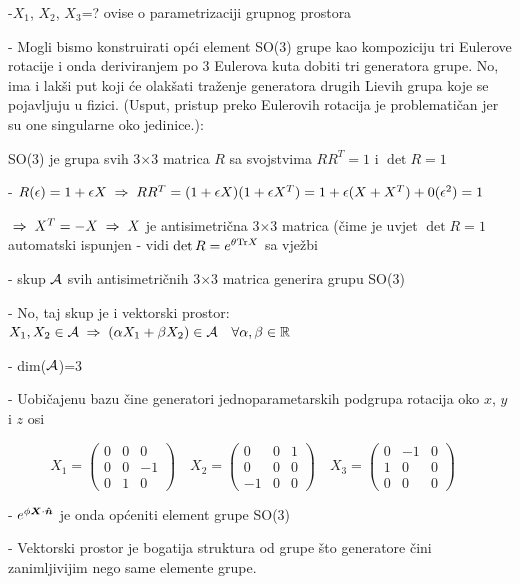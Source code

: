 -$X_1$, $X_2$, $X_3$=? \quad\textrm{ovise o parametrizaciji grupnog prostora}

- Mogli bismo konstruirati opći element SO(3) grupe kao kompoziciju tri
 Eulerove rotacije i onda deriviranjem po 3 Eulerova kuta dobiti tri
 generatora grupe. No, ima i lakši put koji će olakšati traženje 
 generatora drugih Lievih grupa koje se pojavljuju u fizici. 
 (Usput, pristup preko Eulerovih
 rotacija je problematičan jer su one singularne oko jedinice.):

SO(3) je grupa svih 3$\times$3 matrica $R$ sa svojstvima  
  $RR^{T}=1$ i $\det R=1$

- $R(\epsilon)=1+\epsilon X \;\Rightarrow\; RR^{T}=(1+\epsilon X)(1+\epsilon 
   X^{T}) = 1+\epsilon (X+X^{T})+0(\epsilon^2) = 1$

$\;\Rightarrow\; X^T=-X \;\Rightarrow\; X$ je antisimetrična 3$\times$3 matrica (čime je uvjet
$\det R=1$ automatski ispunjen - vidi 
   $\det R = e^{\theta\textrm{\scriptsize Tr} X}$ sa vježbi

- skup $\mathcal{A}$ svih antisimetričnih 3$\times$3 matrica generira grupu SO(3)

- No, taj skup je i vektorski prostor: $X_1,X_2\in\mathcal{A}\;\Rightarrow\;
    (\alpha X_1 + \beta X_2)\in\mathcal{A} \quad \forall \alpha, \beta\in\mathbb{R}$

- dim($\mathcal{A}$)=3

- Uobičajenu bazu čine generatori jednoparametarskih podgrupa rotacija oko
  $x$, $y$ i $z$ osi

\begin{equation}
X_1=\left(
\begin{array}{ccc}
0 & 0 & 0 \\ 
0 & 0 &-1 \\
0 & 1 & 0
\end{array} \right) \quad
X_2=\left(
\begin{array}{ccc}
0 & 0 & 1 \\ 
0 & 0 & 0 \\
-1& 0 & 0
\end{array} \right) \quad
X_3=\left(
\begin{array}{ccc}
0 & -1 & 0 \\ 
1& 0 & 0 \\
0 & 0 & 0
\end{array} \right) \quad
\label{eq:SO3generators}
\end{equation}

- $e^{\phi \vec{X}\cdot\unitn}$ je onda općeniti element grupe SO(3)

- Vektorski prostor je bogatija struktura od grupe što generatore
 čini zanimljivijim nego same elemente grupe.

